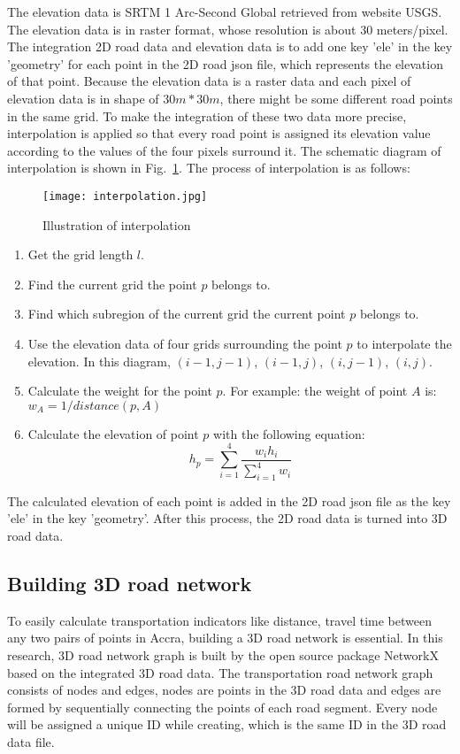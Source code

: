\documentclass[final-report]{report-template}
\begin{document}
The elevation data is SRTM 1 Arc-Second Global retrieved from website USGS. The elevation data is in raster format, whose resolution is about 30 meters/pixel. 
The integration 2D road data and elevation data is to add one key 'ele' in the key 'geometry' for each point in the 2D road json file, which represents the elevation of that point. 
Because the elevation data is a raster data and each pixel of elevation data is in shape of $30m*30m$, 
there might be some different road points in the same grid. 
To make the integration of these two data more precise, interpolation is applied so that every road point is assigned its elevation value according to the values of the four pixels surround it.
The schematic diagram of interpolation is shown in Fig.~\ref{fig:interpolation}. The process of interpolation is as follows:
\begin{figure}[H]
    \centering
    \texttt{[image: interpolation.jpg]}
    \caption{Illustration of interpolation}
    \label{fig:interpolation}
\end{figure}

\begin{enumerate}
    \item Get the grid length $l$.
    \item Find the current grid the point $p$ belongs to.
    \item Find which subregion of the current grid the current point $p$ belongs to.
    \item Use the elevation data of four grids surrounding the point $p$ to interpolate the elevation. In this diagram, $(i-1,j-1)$, $(i-1,j)$, $(i,j-1)$, $(i,j)$.
    \item Calculate the weight for the point $p$. For example: the weight of point $A$ is: $w_A = 1/distance(p, A)$
    \item Calculate the elevation of point $p$ with the following equation:
    \begin{equation}
        h_p = \sum_{i=1}^{4}\frac{w_i h_i}{\sum_{i=1}^{4} w_i}
    \end{equation}
\end{enumerate}

The calculated elevation of each point is added in the 2D road json file as the key 'ele' in the key 'geometry'.
After this process, the 2D road data is turned into 3D road data.

\subsection{Building 3D road network}
To easily calculate transportation indicators like distance, travel time between any two pairs of points in Accra, building a 3D road network is essential.
In this research, 3D road network graph is built by the open source package NetworkX based on the integrated 3D road data.
The transportation road network graph consists of nodes and edges, nodes are points in the 3D road data and edges are formed by sequentially connecting the points of each road segment.   
Every node will be assigned a unique ID while creating, which is the same ID in the 3D road data file.
\end{document}

